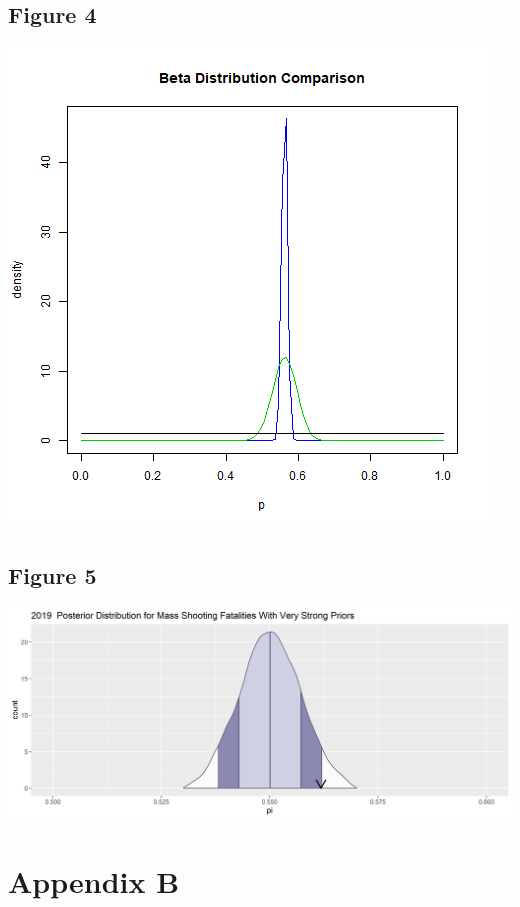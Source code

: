 \documentclass{article}
\begin{document}
\subsection{Figure 4}
\includegraphics[scale=.75]{Figure4.png}\label{Figure 4}

\subsection{Figure 5}
\includegraphics[scale=.5]{Figure5.png}\label{Figure 5}

\section{Appendix B}
\end{document}

